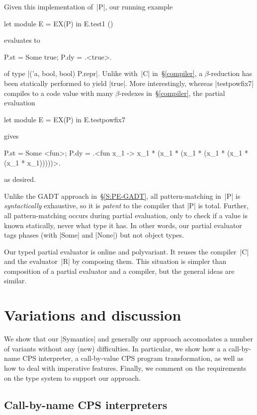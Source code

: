 \documentclass[preprint]{sigplanconf}
\begin{document}
Given this implementation of~|P|, our running example
\begin{code}
let module E = EX(P) in E.test1 ()
\end{code}
evaluates to
\begin{code}
{P.st = Some true; P.dy = .<true>.}
\end{code}
of type |('a, bool, bool) P.repr|.  Unlike with~|C| in~\S\ref{compiler},
a $\beta$-reduction has been statically performed to yield |true|.  More
interestingly, whereas |testpowfix7| compiles to a code value with many
$\beta$-redexes in~\S\ref{compiler}, the partial evaluation
\begin{code}
let module E = EX(P) in E.testpowfix7
\end{code}
gives
\begin{code}
{P.st = Some <fun>;
 P.dy = .<fun x_1 -> x_1 * (x_1 * (x_1 * (x_1 *
                    (x_1 * (x_1 * x_1)))))>.}
\end{code}
as desired.

Unlike the GADT approach in~\S\ref{S:PE-GADT}, all pattern\hyp matching
in~|P| is \emph{syntactically} exhaustive, so it is \emph{patent} to the
compiler that |P| is total.  Further, all pattern\hyp matching occurs
during partial evaluation, only to check if a value is known statically,
never what type it has.  In other words, our partial evaluator tags
phases (with |Some| and |None|) but not object types.

Our typed partial evaluator is online and polyvariant.  It reuses the
compiler~|C| and the evaluator~|R| by composing them.  This situation is
simpler than  composition of a partial
evaluator and a compiler, but the general ideas are similar.

\section{Variations and discussion}\label{discussion}

We show that our |Symantics| and generally our approach accomodates
a number of variants without any (new) difficulties.  In particular,
we show how a a call-by-name CPS interpreter, a call-by-value CPS
program transformation, as well as how to deal with imperative features.
Finally, we comment on the requirements on the type system to support 
our approach.

\subsection{Call-by-name CPS interpreters}\label{S:CPS}
\end{document}
